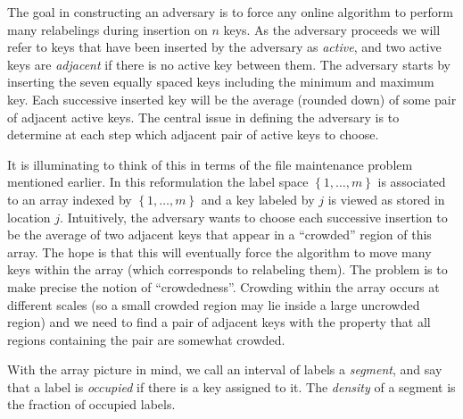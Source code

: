 \documentclass[11pt]{article}
\newcommand{\natInt}[2]{ \left\{ #1, \dotsc, #2 \right\} }
\begin{document}
\iffalse
 If one can show that the cost of the derived bucketing strategy is no more than a constant times  the cost paid by the algorithm for relabelings then a lower bound on bucketing
will give a similar lower bound on the cost of any online labeling algorithm.  Unfortunately, their proof sketch does not show this.
In particular, a single relabeling step may correspond to a bucketing step whose cost is $\Omega(\log n))$, and this
undermines the reduction.
This may happen when inserting $\Theta(\log n)$ items into an empty segment of size $n^\epsilon$ without triggering any relabelings.
We construct a different adversary for which one gets the needed correspondence
between relabeling cost and bucketing steps.
\fi

The goal in constructing an adversary is to force any online algorithm to perform many relabelings during insertion on $n$ keys.
As the adversary proceeds we will refer to keys that have been inserted by the adversary as  
{\em active}, and two active keys are {\em adjacent} if there is no active key between them. 
The adversary starts by inserting the seven equally spaced keys including the minimum and maximum key.
Each successive inserted key will be  the average (rounded down) of some pair of adjacent
active keys.   The central issue in defining the adversary is to determine at each step which
adjacent  pair of active keys to choose. 

It is illuminating to think of this in terms of the file maintenance problem mentioned earlier.
In this reformulation the label space $\natInt{1}{m}$ is associated to an array indexed by $\natInt{1}{m}$
and a key labeled by $j$ is viewed as stored in location $j$.
Intuitively, the adversary wants to choose each successive insertion to be the
average of two adjacent keys that appear in a ``crowded'' region of this array.  The hope is that this will
eventually force the algorithm to move many keys within the array (which corresponds to relabeling them).
The problem is to make precise the notion of ``crowdedness''.
Crowding within the array occurs at different scales (so a small crowded region may lie inside a large uncrowded region)
and we need to find a pair of adjacent keys with the property that all regions containing the pair are somewhat crowded.

With the array picture in mind,
we  call an interval of labels a \emph{segment}, and say that a label is {\em occupied} if there is a key assigned to it.
The \emph{density} of a segment is the fraction of occupied labels.
\end{document}

